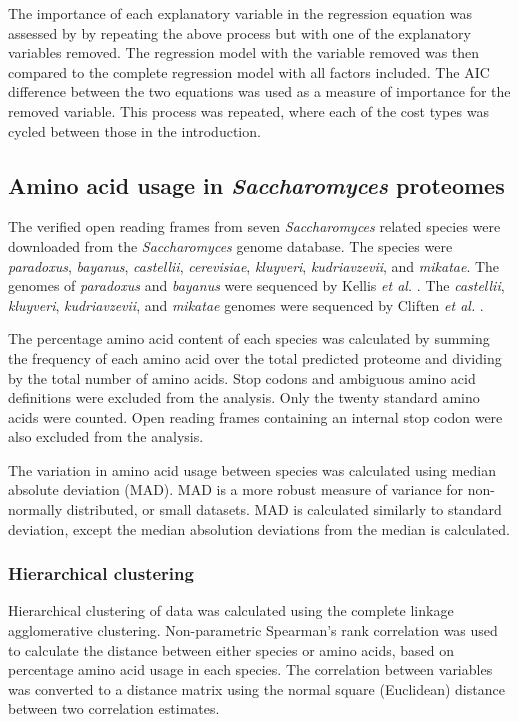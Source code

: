 The importance of each explanatory variable in the regression equation was assessed by by repeating the above process but with one of the explanatory variables removed. The regression model with the variable removed was then compared to the complete regression model with all factors included. The AIC difference between the two equations was used as a measure of importance for the removed variable. This process was repeated, where each of the cost types was cycled between those in the introduction.

\subsection{Amino acid usage in \emph{Saccharomyces} proteomes}

The verified open reading frames from seven \emph{Saccharomyces} related species were downloaded from the \emph{Saccharomyces} genome database. The species were \emph{paradoxus}, \emph{bayanus}, \emph{castellii}, \emph{cerevisiae}, \emph{kluyveri}, \emph{kudriavzevii}, and \emph{mikatae}. The genomes of \emph{paradoxus} and \emph{bayanus} were sequenced by Kellis \emph{et al.} \cite{kellis2003}. The \emph{castellii}, \emph{kluyveri}, \emph{kudriavzevii}, and \emph{mikatae} genomes were sequenced by Cliften \emph{et al.} \cite{cliften2003}.

The percentage amino acid content of each species was calculated by summing the frequency of each amino acid over the total predicted proteome and dividing by the total number of amino acids. Stop codons and ambiguous amino acid definitions were excluded from the analysis. Only the twenty standard amino acids were counted. Open reading frames containing an internal stop codon were also excluded from the analysis.

The variation in amino acid usage between species was calculated using median absolute deviation (MAD). MAD is a more robust measure of variance for non-normally distributed, or small datasets. MAD is calculated similarly to standard deviation, except the median absolution deviations from the median is calculated.

\subsubsection{Hierarchical clustering}

Hierarchical clustering of data was calculated using the complete linkage agglomerative clustering. Non-parametric Spearman's rank correlation was used to calculate the distance between either species or amino acids, based on percentage amino acid usage in each species. The correlation between variables was converted to a distance matrix using the normal square (Euclidean) distance between two correlation estimates.

